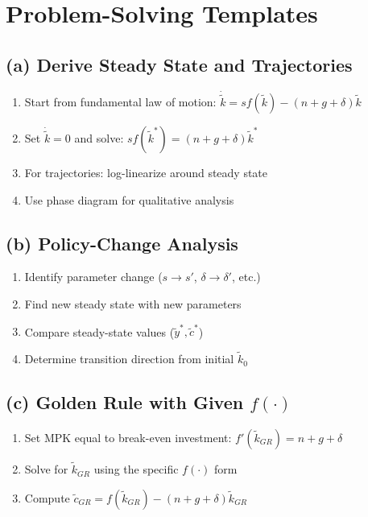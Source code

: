 \documentclass[a4paper,11pt]{article}
\newcommand{\ktilde}{\tilde{k}}
\newcommand{\ytilde}{\tilde{y}}
\newcommand{\ctilde}{\tilde{c}}
\begin{document}
\clearpage

\section{Problem-Solving Templates}

\subsection*{(a) Derive Steady State and Trajectories}

\begin{enumerate}
    \item Start from fundamental law of motion: $\dot{\ktilde} = s f(\ktilde) - (n + g + \delta)\ktilde$
    \item Set $\dot{\ktilde} = 0$ and solve: $s f(\ktilde^{*}) = (n + g + \delta)\ktilde^{*}$
    \item For trajectories: log-linearize around steady state
    \item Use phase diagram for qualitative analysis
\end{enumerate}

\subsection*{(b) Policy-Change Analysis}

\begin{enumerate}
    \item Identify parameter change ($s \to s'$, $\delta \to \delta'$, etc.)
    \item Find new steady state with new parameters
    \item Compare steady-state values ($\ytilde^{*}, \ctilde^{*}$)
    \item Determine transition direction from initial $\ktilde_0$
\end{enumerate}

\subsection*{(c) Golden Rule with Given $f(\cdot)$}

\begin{enumerate}
    \item Set MPK equal to break-even investment: $f'(\ktilde_{GR}) = n + g + \delta$
    \item Solve for $\ktilde_{GR}$ using the specific $f(\cdot)$ form
    \item Compute $\ctilde_{GR} = f(\ktilde_{GR}) - (n + g + \delta)\ktilde_{GR}$
\end{enumerate}
\end{document}
